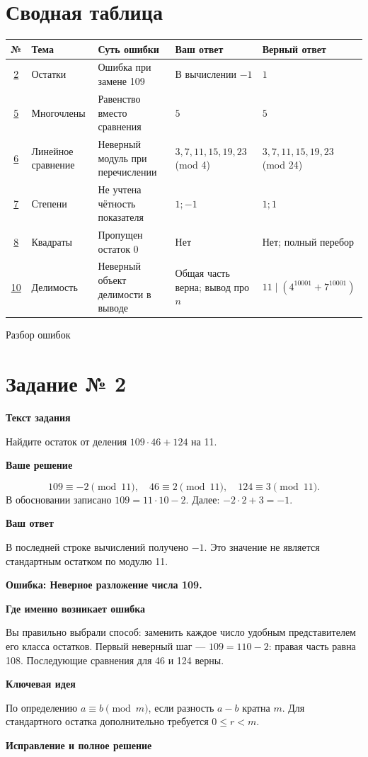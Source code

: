 \documentclass[a4paper,12pt]{article}
\newcommand{\block}[1]{\par\medskip\textbf{#1}\par\nopagebreak[3]}
\newcommand{\err}[1]{\block{\textcolor{red!75!black}{Ошибка:} #1}}
\newcommand{\idea}{\block{\textcolor{blue!60!black}{Ключевая идея}}}
\newcommand{\task}[1]{\clearpage\phantomsection\label{task:#1}\section*{\textcolor{accent}{Задание № #1}}}
\begin{document}
\section*{\textcolor{accent}{Сводная таблица}}
\small
\renewcommand{\arraystretch}{1.45}
\begin{tabularx}{\linewidth}{@{}c >{\raggedright\arraybackslash}p{.20\linewidth} >{\raggedright\arraybackslash}X >{\raggedright\arraybackslash}p{.20\linewidth} >{\raggedright\arraybackslash}p{.21\linewidth}@{}}
\toprule
№ & Тема & Суть ошибки & Ваш ответ & Верный ответ\\
\midrule
\hyperref[task:2]{2} & Остатки & Ошибка при замене 109 & В вычислении $-1$ & $1$\\
\hyperref[task:5]{5} & Многочлены & Равенство вместо сравнения & $5$ & $5$\\
\hyperref[task:6]{6} & Линейное сравнение & Неверный модуль при перечислении & $3,7,11,15,19,23$ (mod 4) & $3,7,11,15,19,23$ (mod 24)\\
\hyperref[task:7]{7} & Степени & Не учтена чётность показателя & $1; -1$ & $1;1$\\
\hyperref[task:8]{8} & Квадраты & Пропущен остаток 0 & Нет & Нет; полный перебор\\
\hyperref[task:10]{10} & Делимость & Неверный объект делимости в выводе & Общая часть верна; вывод про $n$ & $11\mid(4^{10001}+7^{10001})$\\
\bottomrule
\end{tabularx}
\normalsize
\clearpage
\thispagestyle{empty}
\vspace*{\fill}
\begin{center}{\Huge\color{accent} Разбор ошибок}\end{center}
\vspace*{\fill}
\task{2}
\block{Текст задания}
Найдите остаток от деления $109\cdot46+124$ на 11.
\block{Ваше решение}
\[
109\equiv-2\pmod{11},\quad 46\equiv2\pmod{11},\quad124\equiv3\pmod{11}.
\]
В обосновании записано $109=11\cdot10-2$. Далее: $-2\cdot2+3=-1$.
\block{Ваш ответ}
В последней строке вычислений получено $-1$. Это значение не является стандартным остатком по модулю 11.
\err{Неверное разложение числа 109.}
\block{Где именно возникает ошибка}
Вы правильно выбрали способ: заменить каждое число удобным представителем его класса остатков. Первый неверный шаг --- $109=110-2$: правая часть равна 108. Последующие сравнения для 46 и 124 верны.
\idea
По определению $a\equiv b\pmod m$, если разность $a-b$ кратна $m$. Для стандартного остатка дополнительно требуется $0\le r<m$.
\block{Исправление и полное решение}
\end{document}
